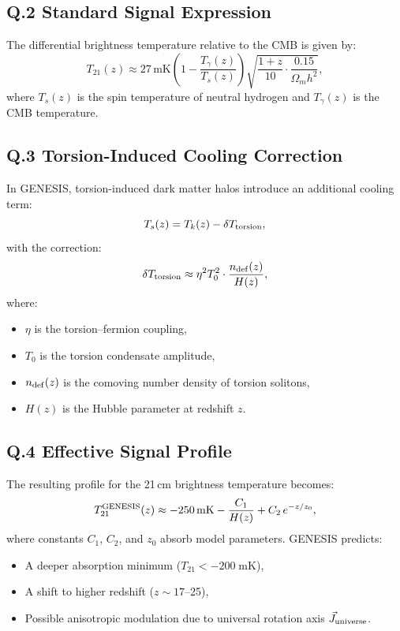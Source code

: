 \documentclass{article}
\begin{document}
\subsection*{Q.2 Standard Signal Expression}
The differential brightness temperature relative to the CMB is given by:
\begin{equation}
T_{21}(z) \approx 27\,\mathrm{mK} \left(1 - \frac{T_\gamma(z)}{T_s(z)}\right) \sqrt{\frac{1+z}{10} \cdot \frac{0.15}{\Omega_m h^2}},
\end{equation}
where \(T_s(z)\) is the spin temperature of neutral hydrogen and \(T_\gamma(z)\) is the CMB temperature.

\subsection*{Q.3 Torsion-Induced Cooling Correction}
In GENESIS, torsion-induced dark matter halos introduce an additional cooling term:
\begin{equation}
T_s(z) = T_k(z) - \delta T_{\rm torsion},
\end{equation}
with the correction:
\begin{equation}
\delta T_{\rm torsion} \approx \eta^2 T_0^2 \cdot \frac{n_{\rm def}(z)}{H(z)},
\end{equation}
where:
\begin{itemize}
  \item \(\eta\) is the torsion–fermion coupling,
  \item \(T_0\) is the torsion condensate amplitude,
  \item \(n_{\rm def}(z)\) is the comoving number density of torsion solitons,
  \item \(H(z)\) is the Hubble parameter at redshift \(z\).
\end{itemize}

\subsection*{Q.4 Effective Signal Profile}
The resulting profile for the 21\,cm brightness temperature becomes:
\begin{equation}
T_{21}^{\rm GENESIS}(z) \approx -250\,\mathrm{mK} - \frac{C_1}{H(z)} + C_2\,e^{-z/z_0},
\end{equation}
where constants \(C_1\), \(C_2\), and \(z_0\) absorb model parameters. GENESIS predicts:
\begin{itemize}
  \item A deeper absorption minimum (\(T_{21} < -200\;\mathrm{mK}\)),
  \item A shift to higher redshift (\(z \sim 17\)–25),
  \item Possible anisotropic modulation due to universal rotation axis \(\vec{J}_{\rm universe}\).
\end{itemize}
\end{document}
